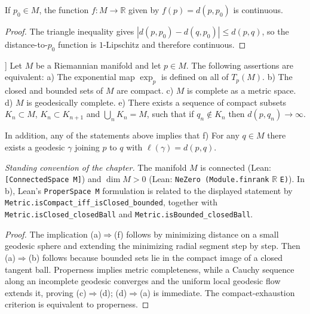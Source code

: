 \begin{corollary}

  \label{cor:dc-ch7-2-7}
  \leanok
If $p_0\in M$, the function $f:M\to\mathbb{R}$ given by $f(p)=d(p,p_0)$ is
  continuous.
\begin{proof}

  \leanok
\sketch The triangle inequality gives $|d(p,p_0)-d(q,p_0)|\le d(p,q)$, so the distance-to-$p_0$ function is $1$-Lipschitz and therefore continuous.
\end{proof}
\end{corollary}

\begin{theorem}
]
  \label{thm:dc-ch7-2-8}
  \leanok
  Let $M$ be a Riemannian manifold and let $p\in M$. The following assertions are
  equivalent:
a) The exponential map $\exp_p$ is defined on all of $T_p(M)$.
b) The closed and bounded sets of $M$ are compact.
c) $M$ is complete as a metric space.
d) $M$ is geodesically complete.
e) There exists a sequence of compact subsets $K_n\subset M$, $K_n\subset K_{n+1}$
     and $\bigcup_n K_n=M$, such that if $q_n\notin K_n$ then $d(p,q_n)\to\infty$.

In addition, any of the statements above implies that
f) For any $q\in M$ there exists a geodesic $\gamma$ joining $p$ to $q$ with
     $\ell(\gamma)=d(p,q)$.

\emph{Standing convention of the chapter.} The manifold $M$ is connected
(Lean: \texttt{[ConnectedSpace M]}) and $\dim M>0$
(Lean: \texttt{NeZero (Module.finrank} $\mathbb R$ \texttt{E)}).
In b), Lean's \texttt{ProperSpace M} formulation is related to the displayed
statement by \texttt{Metric.isCompact\_iff\_isClosed\_bounded}, together with
\texttt{Metric.isClosed\_closedBall} and \texttt{Metric.isBounded\_closedBall}.
\begin{proof}

  \leanok
\sketch The implication (a)$\Rightarrow$(f) follows by minimizing distance on a small geodesic sphere and extending the minimizing radial segment step by step. Then (a)$\Rightarrow$(b) follows because bounded sets lie in the compact image of a closed tangent ball. Properness implies metric completeness, while a Cauchy sequence along an incomplete geodesic converges and the uniform local geodesic flow extends it, proving (c)$\Rightarrow$(d); (d)$\Rightarrow$(a) is immediate. The compact-exhaustion criterion is equivalent to properness.
\end{proof}
\end{theorem}

